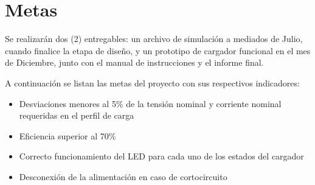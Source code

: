 \section{Metas}



Se realizarán dos (2) entregables: un archivo de simulación a mediados de Julio,
cuando finalice la etapa de diseño,
y un prototipo de cargador funcional en el mes de Diciembre,
junto con el manual de instrucciones y el informe final.

A continuación se listan las metas del proyecto con sus respectivos indicadores:

\begin{itemize}
    \item Desviaciones menores al 5\% de la tensión nominal y corriente nominal requeridas en el perfil de carga
    \item Eficiencia superior al 70\% %
    \item Correcto funcionamiento del LED para cada uno de los estados del cargador
    \item Desconexión de la alimentación en caso de cortocircuito
\end{itemize}